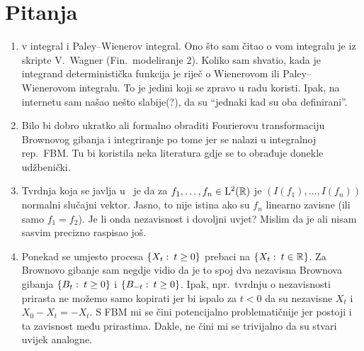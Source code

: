 \documentclass[main.tex]{subfiles}
\begin{document}
\nocite{*}

\chapter{Pitanja}

\begin{enumerate}
	\item \ito v integral i Paley--Wienerov integral. Ono što sam
	      čitao o \ito vom integralu je iz skripte V.\ Wagner (Fin.\ modeliranje 2).
	      Koliko sam shvatio, kada je integrand deterministička funkcija
	      je riječ o Wienerovom ili Paley--Wienerovom integralu. To je jedini koji
	      se zpravo u radu koristi. Ipak, na internetu sam našao nešto slabije(?), da
	      su \enquote{jednaki kad su oba definirani}.

	\item Bilo bi dobro ukratko ali formalno obraditi Fourierovu transformaciju
	      Brownovog gibanja i integriranje po tome jer se nalazi u integralnoj rep.\ FBM.
	      Tu bi koristila neka literatura gdje se to obrađuje donekle udžbenički.

	\item Tvrdnja koja se javlja u~\cite[str.~6]{se} je
	      da za \( f_1,\ldots,f_n \in \mathrm{L}^2(\mathbb{R}) \)
	      je \( (I(f_1),\ldots,I(f_n)) \) normalni slučajni vektor. Jasno,
	      to nije istina ako su \( f_n \)  linearno zavisne (ili samo \( f_1=f_2 \)).
	      Je li onda nezavisnost i dovoljni uvjet? Mislim da je
	      ali nisam sasvim precizno raspisao još.

	\item Ponekad se umjesto procesa \( \left\{ X_t \, \colon \, t \ge 0 \right\} \)
	      prebaci na \( \left\{ X_t \, \colon \, t \in \mathbb{R} \right\} \). Za Brownovo gibanje
	      sam negdje vidio da je to spoj dva nezavisna Brownova gibanja
	      \( \left\{ B_t \, \colon \, t \ge 0 \right\} \)
	      i \( \left\{ B_{-t} \, \colon \, t \ge 0 \right\} \). Ipak, npr.\ tvrdnju o nezavisnosti
	      prirasta ne možemo samo kopirati jer bi ispalo
	      za \( t < 0 \)
	      da su nezavisne \( X_t \) i \( X_0 - X_t = -X_t \).
	      S FBM mi se čini potencijalno problematičnije jer postoji i ta
	      zavisnost među prirastima. Dakle, ne čini mi se trivijalno
	      da su stvari uvijek analogne.


\end{enumerate}
\end{document}
